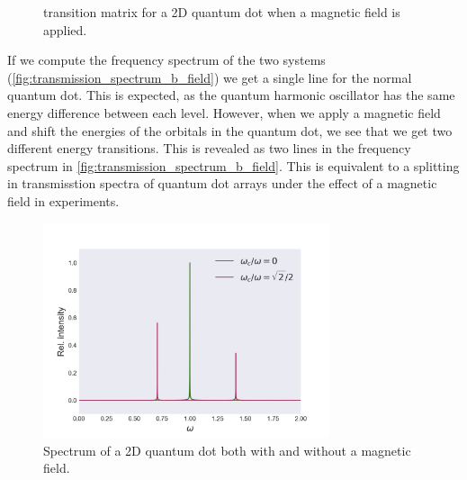 \begin{figure}
\begin{center}
\begin{minipage}{0.49\textwidth}
        \caption{transition matrix for a 2D quantum dot when a magnetic field
            is applied.}
        \label{fig:transition_yes_b}
    \end{minipage}        
    \end{center}
\end{figure}

If we compute the frequency spectrum of the two systems
(\autoref{fig:transmission_spectrum_b_field}) we get a single line for the 
normal quantum dot. This is expected, as the quantum harmonic oscillator has 
the same energy difference between each level. However, when we apply a magnetic
field and shift the energies of the orbitals in the quantum dot, we see that we 
get two different energy transitions. This is revealed as two lines in the 
frequency spectrum in \autoref{fig:transmission_spectrum_b_field}. This is equivalent 
to a splitting in transmisstion spectra of quantum dot arrays under the effect 
of a magnetic field in experiments\cite{heitmann1993spectroscopy,meurer1992single}.

\begin{figure}
    \centering
    \includegraphics[width=0.75\textwidth]{results/figures/transmission_spectrum.png}
    \caption{Spectrum of a 2D quantum dot both with and without a magnetic field.}
    \label{fig:transmission_spectrum_b_field}
\end{figure}
